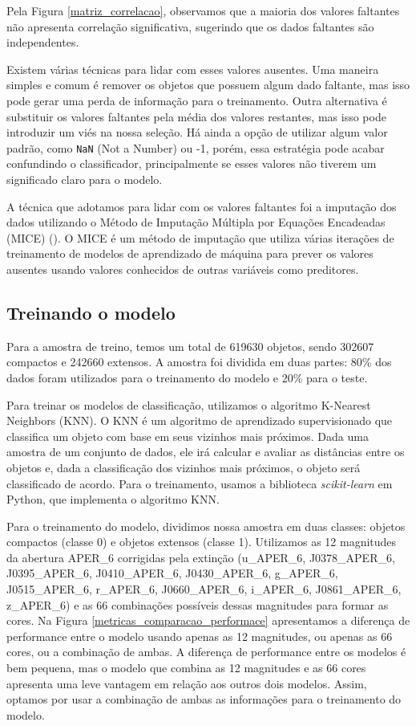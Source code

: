 Pela Figura \ref{matriz_correlacao}, observamos que a maioria dos valores faltantes não apresenta correlação significativa, sugerindo que os dados faltantes são independentes.

Existem várias técnicas para lidar com esses valores ausentes. Uma maneira simples e comum é remover os objetos que possuem algum dado faltante, mas isso pode gerar uma perda de informação para o treinamento. Outra alternativa é substituir os valores faltantes pela média dos valores restantes, mas isso pode introduzir um viés na nossa seleção. Há ainda a opção de utilizar algum valor padrão, como \texttt{NaN} (Not a Number) ou -1, porém, essa estratégia pode acabar confundindo o classificador, principalmente se esses valores não tiverem um significado claro para o modelo.

A técnica que adotamos para lidar com os valores faltantes foi a imputação dos dados utilizando o Método de Imputação Múltipla por Equações Encadeadas (MICE) (\citealp{MICE}). O MICE é um método de imputação que utiliza várias iterações de treinamento de modelos de aprendizado de máquina para prever os valores ausentes usando valores conhecidos de outras variáveis como preditores.

\subsection{Treinando o modelo}\label{subsec:treinando_modelo}

Para a amostra de treino, temos um total de 619630 objetos, sendo 302607 compactos e 242660 extensos. A amostra foi dividida em duas partes: 80\% dos dados foram utilizados para o treinamento do modelo e 20\% para o teste.

Para treinar os modelos de classificação, utilizamos o algoritmo K-Nearest Neighbors (KNN). O KNN é um algoritmo de aprendizado supervisionado que classifica um objeto com base em seus vizinhos mais próximos. Dada uma amostra de um conjunto de dados, ele irá calcular e avaliar as distâncias entre os objetos e, dada a classificação dos vizinhos mais próximos, o objeto será classificado de acordo. Para o treinamento, usamos a biblioteca \textit{scikit-learn} em Python, que implementa o algoritmo KNN.

\raggedright
Para o treinamento do modelo, dividimos nossa amostra em duas classes: objetos compactos (classe 0) e objetos extensos (classe 1). Utilizamos as 12 magnitudes da abertura APER\_6 corrigidas pela extinção (u\_APER\_6, J0378\_APER\_6, J0395\_APER\_6, J0410\_APER\_6, J0430\_APER\_6, g\_APER\_6, J0515\_APER\_6, r\_APER\_6, J0660\_APER\_6, i\_APER\_6, J0861\_APER\_6, z\_APER\_6) e as 66 combinações possíveis dessas magnitudes para formar as cores. Na Figura \ref{metricas_comparacao_performace} apresentamos a diferença de performance entre o modelo usando apenas as 12 magnitudes, ou apenas as 66 cores, ou a combinação de ambas. A diferença de performance entre os modelos é bem pequena, mas o modelo que combina as 12 magnitudes e as 66 cores apresenta uma leve vantagem em relação aos outros dois modelos. Assim, optamos por usar a combinação de ambas as informações para o treinamento do modelo.


